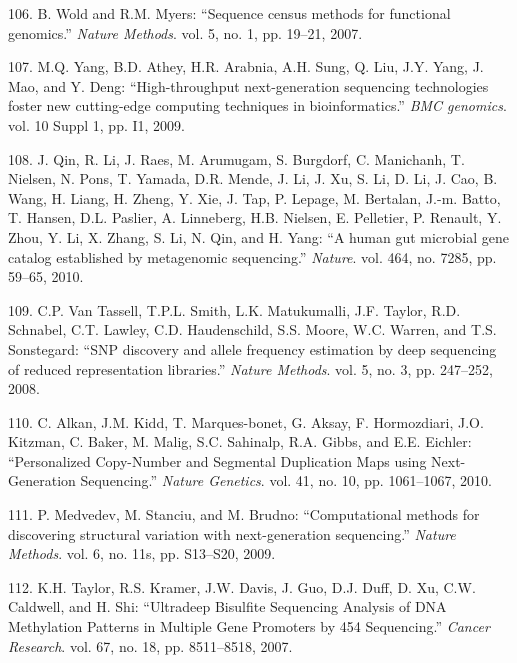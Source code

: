 \documentclass[12pt,twoside]{reedthesis}
\theoremstyle{definition}
\theoremstyle{definition}
\theoremstyle{remark}
\begin{document}
  \hypertarget{ref-Wold2007}{}
  106. B. Wold and R.M. Myers: ``Sequence census methods for functional
  genomics.'' \emph{Nature Methods}. vol. 5, no. 1, pp. 19--21, 2007.
  
  \hypertarget{ref-Yang2009}{}
  107. M.Q. Yang, B.D. Athey, H.R. Arabnia, A.H. Sung, Q. Liu, J.Y. Yang,
  J. Mao, and Y. Deng: ``High-throughput next-generation sequencing
  technologies foster new cutting-edge computing techniques in
  bioinformatics.'' \emph{BMC genomics}. vol. 10 Suppl 1, pp. I1, 2009.
  
  \hypertarget{ref-Qin2010}{}
  108. J. Qin, R. Li, J. Raes, M. Arumugam, S. Burgdorf, C. Manichanh, T.
  Nielsen, N. Pons, T. Yamada, D.R. Mende, J. Li, J. Xu, S. Li, D. Li, J.
  Cao, B. Wang, H. Liang, H. Zheng, Y. Xie, J. Tap, P. Lepage, M.
  Bertalan, J.-m. Batto, T. Hansen, D.L. Paslier, A. Linneberg, H.B.
  Nielsen, E. Pelletier, P. Renault, Y. Zhou, Y. Li, X. Zhang, S. Li, N.
  Qin, and H. Yang: ``A human gut microbial gene catalog established by
  metagenomic sequencing.'' \emph{Nature}. vol. 464, no. 7285, pp. 59--65,
  2010.
  
  \hypertarget{ref-VanTassell2008}{}
  109. C.P. Van Tassell, T.P.L. Smith, L.K. Matukumalli, J.F. Taylor, R.D.
  Schnabel, C.T. Lawley, C.D. Haudenschild, S.S. Moore, W.C. Warren, and
  T.S. Sonstegard: ``SNP discovery and allele frequency estimation by deep
  sequencing of reduced representation libraries.'' \emph{Nature Methods}.
  vol. 5, no. 3, pp. 247--252, 2008.
  
  \hypertarget{ref-Alkan2010}{}
  110. C. Alkan, J.M. Kidd, T. Marques-bonet, G. Aksay, F. Hormozdiari,
  J.O. Kitzman, C. Baker, M. Malig, S.C. Sahinalp, R.A. Gibbs, and E.E.
  Eichler: ``Personalized Copy-Number and Segmental Duplication Maps using
  Next-Generation Sequencing.'' \emph{Nature Genetics}. vol. 41, no. 10,
  pp. 1061--1067, 2010.
  
  \hypertarget{ref-Medvedev2009}{}
  111. P. Medvedev, M. Stanciu, and M. Brudno: ``Computational methods for
  discovering structural variation with next-generation sequencing.''
  \emph{Nature Methods}. vol. 6, no. 11s, pp. S13--S20, 2009.
  
  \hypertarget{ref-Taylor2007}{}
  112. K.H. Taylor, R.S. Kramer, J.W. Davis, J. Guo, D.J. Duff, D. Xu,
  C.W. Caldwell, and H. Shi: ``Ultradeep Bisulfite Sequencing Analysis of
  DNA Methylation Patterns in Multiple Gene Promoters by 454 Sequencing.''
  \emph{Cancer Research}. vol. 67, no. 18, pp. 8511--8518, 2007.
  
\end{document}
